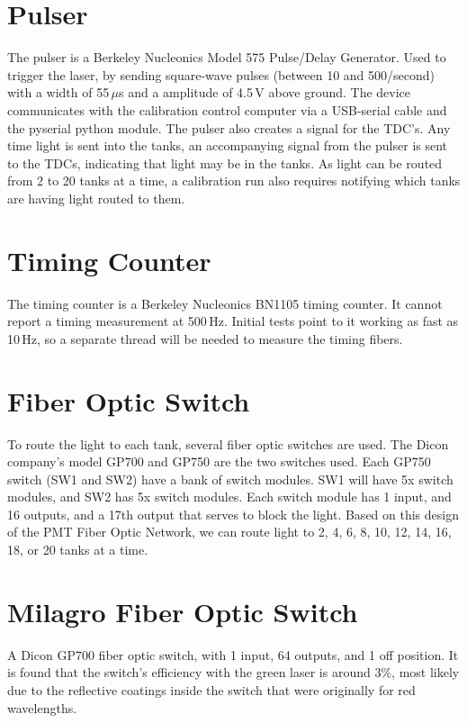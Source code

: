 \section{Pulser}
The pulser is a Berkeley Nucleonics Model 575 Pulse/Delay Generator.
Used to trigger the laser, by sending square-wave pulses (between 10 and 500/second) with a width of 55$\,\mu$s and a amplitude of 4.5$\,$V above ground.
The device communicates with the calibration control computer via a USB-serial cable and the pyserial python module.
The pulser also creates a signal for the TDC’s.  Any time light is sent into the tanks, an accompanying signal from the pulser is sent to the TDCs, indicating that light may be in the tanks.
As light can be routed from 2 to 20 tanks at a time, a calibration run also requires notifying which tanks are having light routed to them.

\section{Timing Counter}\label{timingcounter}
The timing counter is a Berkeley Nucleonics BN1105 timing counter.
It cannot report a timing measurement at 500$\,$Hz.
Initial tests point to it working as fast as 10$\,$Hz, so a separate thread will be needed to measure the timing fibers.

\section{Fiber Optic Switch}
To route the light to each tank, several fiber optic switches are used.
The Dicon company's model GP700 and GP750 are the two switches used.
Each GP750 switch (SW1 and SW2) have a bank of switch modules.
SW1 will have 5x switch modules, and SW2 has 5x switch modules.
Each switch module has 1 input, and 16 outputs, and a 17th output that serves to block the light.
Based on this design of the PMT Fiber Optic Network, we can route light to 2, 4, 6, 8, 10, 12, 14, 16, 18, or 20 tanks at a time.

\section{Milagro Fiber Optic Switch}
A Dicon GP700 fiber optic switch, with 1 input, 64 outputs, and 1 off position.
It is found that the switch's efficiency with the green laser is around 3\%, most likely due to the reflective coatings inside the switch that were originally for red wavelengths.

